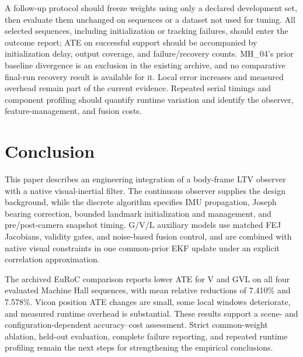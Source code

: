 \documentclass[a4paper,runningheads,twocolumn]{llncs}
\begin{document}
A follow-up protocol should freeze weights using only a declared development set, then evaluate them unchanged on sequences or a dataset not used for tuning. All selected sequences, including initialization or tracking failures, should enter the outcome report; ATE on successful support should be accompanied by initialization delay, output coverage, and failure/recovery counts. MH\_04's prior baseline divergence is an exclusion in the existing archive, and no comparative final-run recovery result is available for it. Local error increases and measured overhead remain part of the current evidence. Repeated serial timings and component profiling should quantify runtime variation and identify the observer, feature-management, and fusion costs.

\section{Conclusion}
This paper describes an engineering integration of a body-frame LTV observer with a native visual-inertial filter. The continuous observer supplies the design background, while the discrete algorithm specifies IMU propagation, Joseph bearing correction, bounded landmark initialization and management, and pre/post-camera snapshot timing. G/V/L auxiliary models use matched FEJ Jacobians, validity gates, and noise-based fusion control, and are combined with native visual constraints in one common-prior EKF update under an explicit correlation approximation.

The archived EuRoC comparison reports lower ATE for V and GVL on all four evaluated Machine Hall sequences, with mean relative reductions of 7.410\% and 7.578\%. Vicon position ATE changes are small, some local windows deteriorate, and measured runtime overhead is substantial. These results support a scene- and configuration-dependent accuracy--cost assessment. Strict common-weight ablation, held-out evaluation, complete failure reporting, and repeated runtime profiling remain the next steps for strengthening the empirical conclusions.



\end{document}
